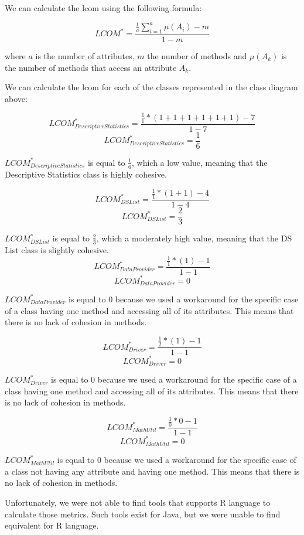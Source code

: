 \documentclass[11pt]{article}
\begin{document}
We can calculate the \gls{lcom} using the following formula:

$$ LCOM^{*} = \frac{\frac{1}{a}\sum\limits_{i=1}^{a} \mu(A_{i})-m}{1-m} $$

where $ a $ is the number of attributes, $ m $ the number of methods and $ \mu(A_{k}) $ is the number of methods that access an attribute $ A_{k} $.

We can calculate the \gls{lcom} for each of the classes represented in the class diagram above:

$$ LCOM^{*}_{Descriptive Statistics} = \frac{\frac{1}{1}*(1+1+1+1+1+1)-7}{1-7} $$
$$ LCOM^{*}_{Descriptive Statistics} = \frac{1}{6} $$

$ LCOM^{*}_{Descriptive Statistics} $ is equal to $ \frac{1}{6} $, which a low value, meaning that the Descriptive Statistics class is highly cohesive.

$$ LCOM^{*}_{DS List} = \frac{\frac{1}{1}*(1+1)-4}{1-4} $$
$$ LCOM^{*}_{DS List} = \frac{2}{3} $$

$ LCOM^{*}_{DS List} $ is equal to $ \frac{2}{3} $, which a moderately high value, meaning that the DS List class is slightly cohesive.
\newpage
$$ LCOM^{*}_{Data Provider} = \frac{\frac{1}{1}*(1)-1}{1-1} $$
$$ LCOM^{*}_{Data Provider} = 0 $$

$ LCOM^{*}_{Data Provider} $ is equal to 0 because we used a workaround for the specific case of a class having one method and accessing all of its attributes. This means that there is no lack of cohesion in methods.

$$ LCOM^{*}_{Driver} = \frac{\frac{1}{2}*(1)-1}{1-1} $$
$$ LCOM^{*}_{Driver} = 0 $$

$ LCOM^{*}_{Driver} $ is equal to 0 because we used a workaround for the specific case of a class having one method and accessing all of its attributes. This means that there is no lack of cohesion in methods.

$$ LCOM^{*}_{Math Util} = \frac{\frac{1}{0}*0-1}{1-1} $$
$$ LCOM^{*}_{Math Util} = 0 $$

$ LCOM^{*}_{Math Util} $ is equal to 0 because we used a workaround for the specific case of a class not having any attribute and having one method. This means that there is no lack of cohesion in methods.

Unfortunately, we were not able to find tools that supports R language to calculate those metrics. Such tools exist for Java, but we were unable to find equivalent for R language.

\newpage
\end{document}
